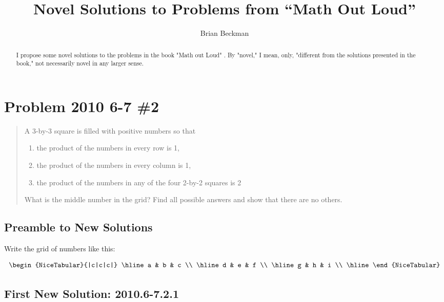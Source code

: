\documentclass{article}
\title{Novel Solutions to Problems from ``Math Out Loud''}
\author{Brian Beckman}
\begin{document}
\maketitle

\begin{abstract}
I propose some novel solutions to the problems in the book "Math out Loud" \cite{MOL21}. By "novel," I mean, only, "different from the solutions presented in the book," not necessarily novel in any larger sense. 
\end{abstract}

\section{Problem 2010 6-7 \#2}

\begin{framed}
\begin{quote}
    A 3-by-3 square is filled with positive numbers so that
    \begin{enumerate}
        \item the product of the numbers in every row is 1, 
        \item the product of the numbers in every column is 1,
        \item the product of the numbers in any of the four 2-by-2 squares is 2
    \end{enumerate}
    What is the middle number in the grid? Find all possible answers and show that there are no others.
\end{quote}
\end{framed}

\subsection{Preamble to New Solutions}

Write the grid of numbers like this:

\begin{equation}
\label{eqn:the-first-grid}
\begin{NiceTabular}{|c|c|c|}
    \hline
    a & b & c  \\ \hline  
    d & e & f  \\ \hline
    g & h & i  \\ \hline
\end{NiceTabular}
\end{equation}

\subsection{First New Solution: 2010.6-7.2.1}
\end{document}
